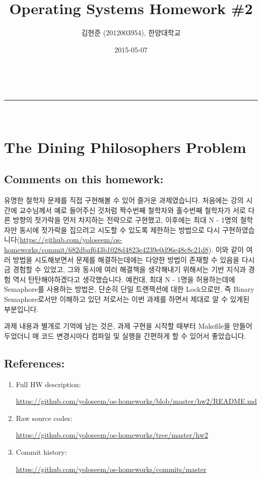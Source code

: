 \documentclass[a4paper,11pt]{article}
\makeatletter
\newcommand{\linia}{\rule{\linewidth}{0.5pt}}
\renewcommand{\maketitle}{
\begin{center}
\vspace{2ex}
{\huge \textsc{\@title}}
\vspace{1ex}
\\
\linia\\
\@author \hfill \@date
\vspace{4ex}
\end{center}
}
\makeatother
\begin{document}
\title{Operating Systems Homework \#2}

\author{김현준 (2012003954), 한양대학교}

\date{2015-05-07}

\maketitle

\section*{The Dining Philosophers Problem}

\subsection*{Comments on this homework:}
    유명한 철학자 문제를 직접 구현해볼 수 있어 즐거운 과제였습니다.
    처음에는 강의 시간에 교수님께서 예로 들어주신 것처럼 짝수번째 철학자와 홀수번째 철학자가 서로 다른 방향의 젓가락을 먼저 차지하는 전략으로 구현했고, 이후에는 최대 {{N - 1}}명의 철학자만 동시에 젓가락을 집으려고 시도할 수 있도록 제한하는 방법으로 다시 구현하였습니다(\url{https://github.com/yoloseem/os-homeworks/commit/682dbaf643b1028d4823e4239e0d96e48c8c21d8}). 이와 같이 여러 방법을 시도해보면서 문제를 해결하는데에는 다양한 방법이 존재할 수 있음을 다시금 경험할 수 있었고, 그와 동시에 여러 해결책을 생각해내기 위해서는 기반 지식과 경험 역시 탄탄해야하겠다고 생각했습니다. 예컨대, 최대 {{N - 1}}명을 허용하는데에 Semaphore를 사용하는 방법은, 단순히 단일 트랜잭션에 대한 Lock으로만, 즉 Binary Semaphore로서만 이해하고 있던 저로서는 이번 과제를 하면서 제대로 알 수 있게된 부분입니다.
    
    과제 내용과 별개로 기억에 남는 것은, 과제 구현을 시작할 때부터 {{Makefile}}을 만들어두었더니 매 코드 변경시마다 컴파일 및 실행을 간편하게 할 수 있어서 좋았습니다.

\subsection*{References:}
\begin{enumerate}
\item
    Full HW description:

        \url{https://github.com/yoloseem/os-homeworks/blob/master/hw2/README.md}

\item
    Raw source codes:

        \url{https://github.com/yoloseem/os-homeworks/tree/master/hw2}

\item
    Commit history:

        \url{https://github.com/yoloseem/os-homeworks/commits/master}
\end{enumerate}
\end{document}
